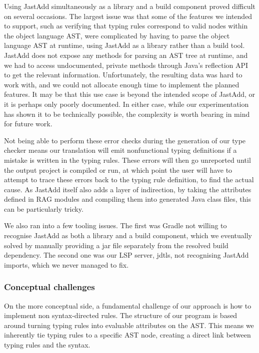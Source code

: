 \documentclass[nofilelist]{cslthse-msc}
\newcommand{\CR}[1]{\textcolor{green!60!black}{[\textbf{CR}:#1]}}
\begin{document}
Using JastAdd simultaneously as a library and a build component proved difficult on several occasions.
The largest issue was that some of the features we intended to support, such as verifying that typing rules correspond to valid nodes within the object language AST, were complicated by having to parse the object language AST at runtime, using JastAdd as a library rather than a build tool.
JastAdd does not expose any methods for parsing an AST tree at runtime, and we had to access undocumented, private methods through Java's reflection API to get the relevant information.
Unfortunately, the resulting data was hard to work with, and we could not allocate enough time to implement the planned features.
It may be that this use case is beyond the intended scope of JastAdd, or it is perhaps only poorly documented.
In either case, while our experimentation has shown it to be technically possible, the complexity is worth bearing in mind for future work.

Not being able to perform these error checks during the generation of our type checker means our translation will emit nonfunctional typing definitions if a mistake is written in the typing rules.
These errors will then go unreported until the output project is compiled or run, at which point the user will have to attempt to trace these errors back to the typing rule definition, to find the actual cause.
As JastAdd itself also adds a layer of indirection, by taking the attributes defined in RAG modules and compiling them into generated Java class files, this can be particularly tricky.

We also ran into a few tooling issues.
The first was Gradle not willing to recognise JastAdd as both a library and a build component, which we eventually solved by manually providing a jar file separately from the resolved build dependency.
The second one was our LSP server, jdtls, not recognising JastAdd imports, which we never managed to fix.


\subsubsection{Conceptual challenges}
On the more conceptual side, a fundamental challenge of our approach is how to implement non syntax-directed rules.
The structure of our program is based around turning typing rules into evaluable attributes on the AST.
This means we inherently tie typing rules to a specific AST node, creating a direct link between typing rules and the syntax.
\end{document}
